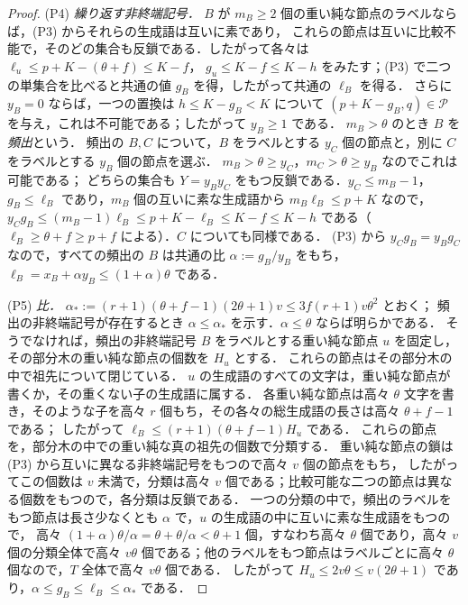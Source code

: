 \begin{proof}
(P4) \emph{繰り返す非終端記号．}
$B$ が $m_B\ge2$ 個の重い純な節点のラベルならば，(P3) からそれらの生成語は互いに素であり，
これらの節点は互いに比較不能で，そのどの集合も反鎖である．したがって各々は $\ell_u\le p+K-(\theta+f)\le K-f$，
$g_u\le K-f\le K-h$ をみたす；(P3) で二つの単集合を比べると共通の値 $g_B$ を得，したがって共通の $\ell_B$ を得る．
さらに $y_B=0$ ならば，一つの置換は $h\le K-g_B<K$ について $(p+K-g_B,q)\in\mathcal P$ を与え，これは不可能である；したがって $y_B\ge1$ である．
$m_B>\theta$ のとき $B$ を\emph{頻出}という．
頻出の $B,C$ について，$B$ をラベルとする $y_C$ 個の節点と，別に $C$ をラベルとする $y_B$ 個の節点を選ぶ．
$m_B>\theta\ge y_C$，$m_C>\theta\ge y_B$ なのでこれは可能である；
どちらの集合も $Y=y_By_C$ をもつ反鎖である．$y_C\le m_B-1$，$g_B\le\ell_B$ であり，$m_B$ 個の互いに素な生成語から $m_B\ell_B\le p+K$ なので，$y_Cg_B\le(m_B-1)\ell_B\le p+K-\ell_B\le K-f\le K-h$ である（$\ell_B\ge\theta+f\ge p+f$ による）．$C$ についても同様である．
(P3) から $y_Cg_B=y_Bg_C$ なので，すべての頻出の $B$ は共通の比 $\alpha:=g_B/y_B$ をもち，$\ell_B=x_B+\alpha y_B\le(1+\alpha)\theta$ である．

(P5) \emph{比．}
$\alpha_*:=(r+1)(\theta+f-1)(2\theta+1)v\le3f(r+1)v\theta^2$ とおく；
頻出の非終端記号が存在するとき $\alpha\le\alpha_*$ を示す．$\alpha\le\theta$ ならば明らかである．
そうでなければ，頻出の非終端記号 $B$ をラベルとする重い純な節点 $u$ を固定し，その部分木の重い純な節点の個数を $H_u$ とする．
これらの節点はその部分木の中で祖先について閉じている．
$u$ の生成語のすべての文字は，重い純な節点が書くか，その重くない子の生成語に属する．
各重い純な節点は高々 $\theta$ 文字を書き，そのような子を高々 $r$ 個もち，その各々の総生成語の長さは高々 $\theta+f-1$ である；
したがって $\ell_B\le(r+1)(\theta+f-1)H_u$ である．
これらの節点を，部分木の中での重い純な真の祖先の個数で分類する．
重い純な節点の鎖は (P3) から互いに異なる非終端記号をもつので高々 $v$ 個の節点をもち，
したがってこの個数は $v$ 未満で，分類は高々 $v$ 個である；比較可能な二つの節点は異なる個数をもつので，各分類は反鎖である．
一つの分類の中で，頻出のラベルをもつ節点は長さ少なくとも $\alpha$ で，$u$ の生成語の中に互いに素な生成語をもつので，
高々 $(1+\alpha)\theta/\alpha=\theta+\theta/\alpha<\theta+1$ 個，すなわち高々 $\theta$ 個であり，高々 $v$ 個の分類全体で高々 $v\theta$ 個である；他のラベルをもつ節点はラベルごとに高々 $\theta$ 個なので，$T$ 全体で高々 $v\theta$ 個である．
したがって $H_u\le2v\theta\le v(2\theta+1)$ であり，$\alpha\le g_B\le\ell_B\le\alpha_*$ である．


\end{proof}
